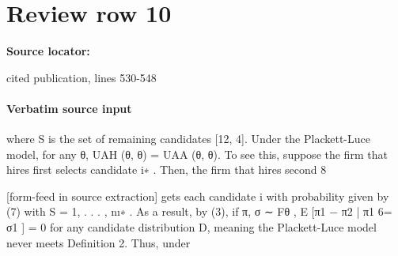 \documentclass[10pt]{article}
\begin{document}
\section*{Review row 10}
\textbf{Source locator:} {\footnotesize\raggedright cited publication, lines 530-\allowbreak{}548\par}
\paragraph{Verbatim source input}
\begin{ReviewVerbatim}
where S is the set of remaining candidates [12, 4]. Under the Plackett-Luce model, for any θ, UAH (θ, θ) =
UAA (θ, θ). To see this, suppose the firm that hires first selects candidate i∗ . Then, the firm that hires second
8


[form-feed in source extraction]
gets each candidate i with probability given by (7) with S = {1, . . . , n}\i∗ . As a result, by (3), if π, σ ∼ Fθ ,
E [π1 − π2 | π1 6= σ1 ] = 0
for any candidate distribution D, meaning the Plackett-Luce model never meets Definition 2. Thus, under
\end{ReviewVerbatim}
\end{document}
